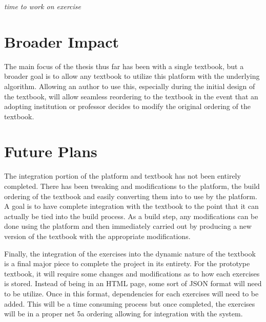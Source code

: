 \textit{time to work on exercise}

\section{Broader Impact}

The main focus of the thesis thus far has been with a single textbook, but a broader goal is to allow any textbook to utilize this platform with the underlying algorithm. Allowing an author to use this, especially during the initial design of the textbook, will allow seamless reordering to the textbook in the event that an adopting institution or professor decides to modify the original ordering of the textbook.

\section{Future Plans}

The integration portion of the platform and textbook has not been entirely completed. There has been tweaking and modifications to the platform, the build ordering of the textbook and easily converting them into to use by the platform. A goal is to have complete integration with the textbook to the point that it can actually be tied into the build process. As a build step, any modifications can be done using the platform and then immediately carried out by producing a new version of the textbook with the appropriate modifications.

Finally, the integration of the exercises into the dynamic nature of the textbook is a final major piece to complete the project in its entirety. For the prototype textbook, it will require some changes and modifications as to how each exercises is stored. Instead of being in an HTML page, some sort of JSON format will need to be utilize. Once in this format, dependencies for each exercises will need to be added. This will be a time consuming process but once completed, the exercises will be in a proper net 5a ordering allowing for integration with the system.
